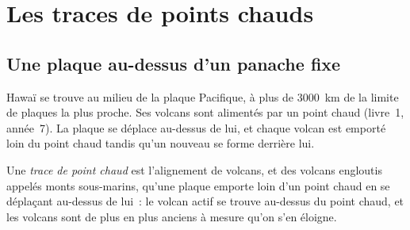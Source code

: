 \section{Les traces de points chauds}

\subsection{Une plaque au-dessus d'un panache fixe}

Hawaï se trouve au milieu de la plaque Pacifique, à plus de \qty{3000}{km}
de la limite de plaques la plus proche.
 Ses volcans sont alimentés par un point chaud (livre~1,
année~7). La plaque se déplace au-dessus de lui, et chaque volcan est
emporté loin du point chaud tandis qu'un nouveau se forme derrière lui.

\begin{definition}\label{def:g11:plate-motions:hotspot-track}
Une \emph{trace de point chaud} est l'alignement
de volcans, et des volcans engloutis appelés monts sous-marins, qu'une
plaque emporte loin d'un point chaud en se déplaçant au-dessus de lui~: le
volcan actif se trouve au-dessus du point chaud, et les volcans sont de plus
en plus anciens à mesure qu'on s'en éloigne.
\end{definition}

